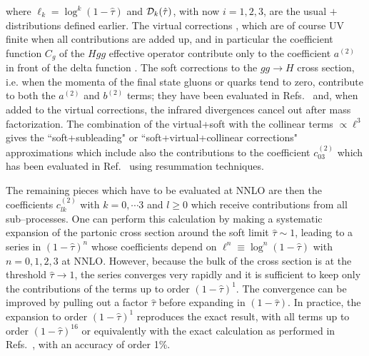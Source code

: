 where $\ell_k= \log^k(1-\hat \tau)$ and ${\cal D}_k(\hat \tau)$, with now $i=1,
2,3$, are the usual $+$ distributions defined earlier. The virtual corrections
\cite{ggH-virtual}, which are of course UV finite when all contributions are
added up, and in particular the coefficient function $C_g$ of the $Hgg$
effective operator contribute only to the coefficient $a^{(2)}$ in front of the
delta function \cite{ggH-virtual,ggH-virtual-E}.  The soft  corrections to
the $gg \to H$ cross section, i.e. when the momenta of the  final state gluons
or quarks tend to zero, contribute to both  the $a^{(2)}$  and $b^{(2)}$ terms;
they have been evaluated in Refs.~\cite{ggH-SSL,ggH-SVC} and, when added to the
virtual corrections, the infrared divergences cancel out after mass
factorization. The combination of the virtual+soft with the collinear terms
$\propto \ell^3$ gives the ``soft+subleading" \cite{ggH-SSL} or
``soft+virtual+collinear corrections" \cite{ggH-SVC} approximations which
include also the contributions  to the coefficient $c^{(2)}_{03}$ which has
been evaluated  in Ref.~\cite{ggH-Laenen} using resummation techniques. \s

The remaining pieces which have to be evaluated at NNLO \cite{ggH-NNLO1} are
then the coefficients $c_{lk}^{(2)}$ with $k=0, \cdots 3$ and $l \geq 0$ which
receive contributions from all sub--processes. One can perform this calculation
by making a systematic expansion of the partonic cross section around the soft
limit $\hat \tau \sim 1$, leading to a series in $(1-\hat \tau)^n$ whose
coefficients  depend on $\ell^n \equiv \log^n(1-\hat \tau)$ with $n=0,1,2,3$ at
NNLO.  However, because the bulk of the cross section is at the threshold $\hat
\tau \to 1$, the series converges very rapidly and it is sufficient to keep
only the contributions of the terms up to order $(1-\hat \tau)^1$. The
convergence can be improved \cite{ggH-HSVC} by pulling  out a factor $\hat
\tau$ before expanding in $(1-\hat \tau)$. In practice, the expansion to order
$(1-\hat \tau)^1$ reproduces the exact result, with all terms up to order
$(1-\hat \tau)^{16}$ or equivalently with the exact calculation as performed in
Refs.~\cite{ggH-NNLO2,ggH-NNLO3}, with an accuracy of order 1\%.\s

